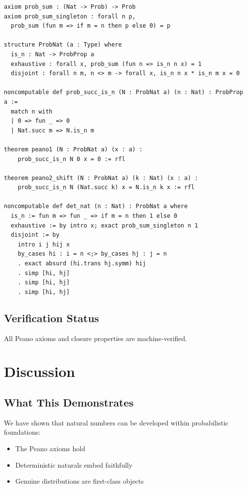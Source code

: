 \documentclass[11pt,a4paper]{article}
\begin{document}
\begin{verbatim}
axiom prob_sum : (Nat -> Prob) -> Prob
axiom prob_sum_singleton : forall n p,
  prob_sum (fun m => if m = n then p else 0) = p

structure ProbNat (a : Type) where
  is_n : Nat -> ProbProp a
  exhaustive : forall x, prob_sum (fun n => is_n n x) = 1
  disjoint : forall n m, n <> m -> forall x, is_n n x * is_n m x = 0

noncomputable def prob_succ_is_n (N : ProbNat a) (n : Nat) : ProbProp a :=
  match n with
  | 0 => fun _ => 0
  | Nat.succ m => N.is_n m

theorem peano1 (N : ProbNat a) (x : a) :
    prob_succ_is_n N 0 x = 0 := rfl

theorem peano2_shift (N : ProbNat a) (k : Nat) (x : a) :
    prob_succ_is_n N (Nat.succ k) x = N.is_n k x := rfl

noncomputable def det_nat (n : Nat) : ProbNat a where
  is_n := fun m => fun _ => if m = n then 1 else 0
  exhaustive := by intro x; exact prob_sum_singleton n 1
  disjoint := by
    intro i j hij x
    by_cases hi : i = n <;> by_cases hj : j = n
    . exact absurd (hi.trans hj.symm) hij
    . simp [hi, hj]
    . simp [hi, hj]
    . simp [hi, hj]
\end{verbatim}

\subsection{Verification Status}

All Peano axioms and closure properties are machine-verified.

\section{Discussion}

\subsection{What This Demonstrates}

We have shown that natural numbers can be developed within probabilistic foundations:
\begin{itemize}
    \item The Peano axioms hold
    \item Deterministic naturals embed faithfully
    \item Genuine distributions are first-class objects
\end{itemize}
\end{document}
